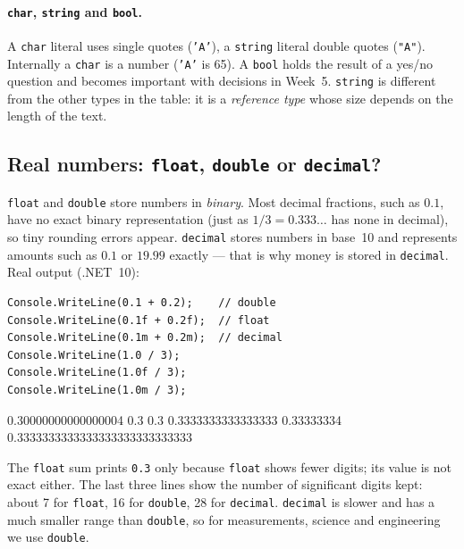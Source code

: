 \paragraph{\texttt{char}, \texttt{string} and \texttt{bool}.} A \texttt{char} literal uses single quotes (\texttt{'A'}), a \texttt{string} literal double quotes (\texttt{"A"}). Internally a \texttt{char} is a number (\texttt{'A'} is 65). A \texttt{bool} holds the result of a yes/no question and becomes important with decisions in Week~5. \texttt{string} is different from the other types in the table: it is a \emph{reference type} whose size depends on the length of the text.

\subsection{Real numbers: \texttt{float}, \texttt{double} or \texttt{decimal}?}
\texttt{float} and \texttt{double} store numbers in \emph{binary}. Most decimal fractions, such as $0.1$, have no exact binary representation (just as $1/3 = 0.333\ldots$ has none in decimal), so tiny rounding errors appear. \texttt{decimal} stores numbers in base~10 and represents amounts such as $0.1$ or $19.99$ exactly --- that is why money is stored in \texttt{decimal}. Real output (.NET~10):
\begin{center}
\begin{minipage}[c]{0.56\linewidth}
\begin{lstlisting}[numbers=none]
Console.WriteLine(0.1 + 0.2);    // double
Console.WriteLine(0.1f + 0.2f);  // float
Console.WriteLine(0.1m + 0.2m);  // decimal
Console.WriteLine(1.0 / 3);
Console.WriteLine(1.0f / 3);
Console.WriteLine(1.0m / 3);
\end{lstlisting}
\end{minipage}\hfill
\begin{minipage}[c]{0.4\linewidth}
\begin{consolebox}[Output]
\begin{run}
0.30000000000000004
0.3
0.3
0.3333333333333333
0.33333334
0.3333333333333333333333333333
\end{run}
\end{consolebox}
\end{minipage}
\end{center}
The \texttt{float} sum prints \texttt{0.3} only because \texttt{float} shows fewer digits; its value is not exact either. The last three lines show the number of significant digits kept: about 7 for \texttt{float}, 16 for \texttt{double}, 28 for \texttt{decimal}. \texttt{decimal} is slower and has a much smaller range than \texttt{double}, so for measurements, science and engineering we use \texttt{double}.

